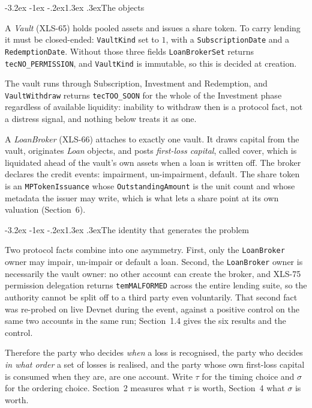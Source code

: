 \documentclass[11pt]{article}
\makeatletter
\renewcommand\subsection{\@startsection{subsection}{2}{\z@}%
  {-3.2ex \@plus -1ex \@minus -.2ex}{1.3ex \@plus .3ex}{\normalfont\large\bfseries}}
\theoremstyle{orma}
\theoremstyle{ormaupright}
\makeatother
\begin{document}
\subsection{The objects}

A \emph{Vault} (XLS-65) holds pooled assets and issues a share token. To carry lending it
must be closed-ended: \texttt{VaultKind} set to $1$, with a \texttt{SubscriptionDate} and a
\texttt{RedemptionDate}. Without those three fields \texttt{LoanBrokerSet} returns
\texttt{tecNO\_PERMISSION}, and \texttt{VaultKind} is immutable, so this is decided at
creation.

The vault runs through Subscription, Investment and Redemption, and
\texttt{VaultWithdraw} returns \texttt{tecTOO\_SOON} for the whole of the Investment phase
regardless of available liquidity: inability to withdraw then is a protocol fact, not a
distress signal, and nothing below treats it as one.

A \emph{LoanBroker} (XLS-66) attaches to exactly one vault. It draws capital from the vault,
originates \emph{Loan} objects, and posts \emph{first-loss capital}, called cover, which is
liquidated ahead of the vault's own assets when a loan is written off. The broker declares
the credit events: impairment, un-impairment, default. The share token is an
\texttt{MPTokenIssuance} whose \texttt{OutstandingAmount} is the unit count and whose
metadata the issuer may write, which is what lets a share point at its own valuation
(Section~6).

\subsection{The identity that generates the problem}

Two protocol facts combine into one asymmetry. First, only the \texttt{LoanBroker} owner may
impair, un-impair or default a loan. Second, the \texttt{LoanBroker} owner is necessarily
the vault owner: no other account can create the broker, and XLS-75 permission delegation
returns \texttt{temMALFORMED} across the entire lending suite, so the authority cannot be
split off to a third party even voluntarily. That second fact was re-probed on live Devnet
during the event, against a positive control on the same two accounts in the same run;
Section~1.4 gives the six results and the control.

Therefore the party who decides \emph{when} a loss is recognised, the party who decides
\emph{in what order} a set of losses is realised, and the party whose own first-loss capital
is consumed when they are, are one account. Write $\tau$ for the timing choice and $\sigma$
for the ordering choice. Section~2 measures what $\tau$ is worth, Section~4 what $\sigma$ is
worth.
\end{document}
